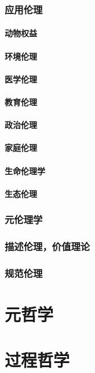 \documentclass[UTF8]{../RepresentationUniverse}
\begin{document}
    \subsection{应用伦理}
        \subsubsection{动物权益}
        \subsubsection{环境伦理}
        \subsubsection{医学伦理}
        \subsubsection{教育伦理}
        \subsubsection{政治伦理}
        \subsubsection{家庭伦理}
        \subsubsection{生命伦理学}
        \subsubsection{生态伦理}

    \subsection{元伦理学}
    \subsection{描述伦理，价值理论}
    \subsection{规范伦理}
    

\chapter{元哲学}
\chapter{过程哲学}
\end{document}
